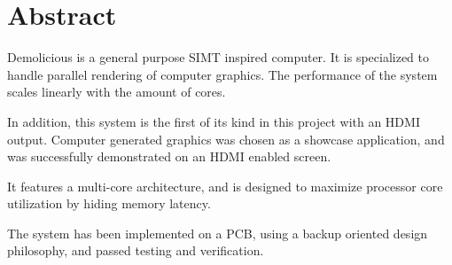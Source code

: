 \documentclass[../main/report.tex]{subfiles}
\begin{document}
\vspace*{\fill}
\chapter*{Abstract}
\label{sec:abstract}

Demolicious is a general purpose SIMT inspired computer.
It is specialized to handle parallel rendering of computer graphics.
The performance of the system scales linearly with the amount of cores.

In addition, this system is the first of its kind in this project with an HDMI output.
Computer generated graphics was chosen as a showcase application,
and was successfully demonstrated on an HDMI enabled screen.

It features a multi-core architecture,
and is designed to maximize processor core utilization by hiding memory latency.

The system has been implemented on a PCB,
using a backup oriented design philosophy, and passed testing and verification.

\vspace*{\fill}
\end{document}

